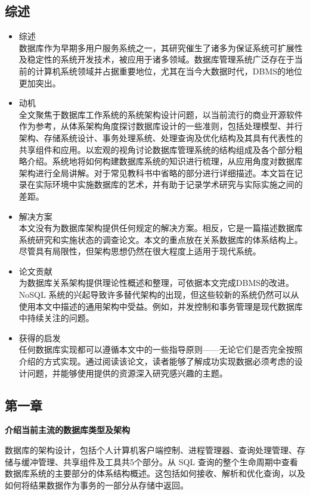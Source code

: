 \documentclass[UTF8,14pt]{article}
\numberwithin{figure}{section}
\begin{document}
\subsection{综述}
\begin{itemize}
      \item 综述\\
            数据库作为早期多用户服务系统之一，其研究催生了诸多为保证系统可扩展性及稳定性的系统开发技术，被应用于诸多领域。数据库管理系统广泛存在于当前的计算机系统领域并占据重要地位，尤其在当今大数据时代，DBMS的地位更加突出。
      \item 动机\\
            全文聚焦于数据库工作系统的系统架构设计问题，以当前流行的商业开源软件作为参考，从体系架构角度探讨数据库设计的一些准则，包括处理模型、并行架构、存储系统设计、事务处理系统、处理查询及优化结构及其具有代表性的共享组件和应用。以宏观的视角讨论数据库管理系统的结构组成及各个部分粗略介绍。系统地将如何构建数据库系统的知识进行梳理，从应用角度对数据库架构进行全局讲解。对于常见教科书中省略的部分进行详细描述。本文旨在记录在实际环境中实施数据库的艺术，并有助于记录学术研究与实际实施之间的差距。
      \item 解决方案\\
            本文没有为数据库架构提供任何规定的解决方案。相反，它是一篇描述数据库系统研究和实施状态的调查论文。本文的重点放在关系数据库的体系结构上。尽管具有局限性，但架构思想仍然在很大程度上适用于现代系统。
      \item 论文贡献\\
            为数据库关系架构提供理论性概述和整理，可依据本文完成DBMS的改进。NoSQL 系统的兴起导致许多替代架构的出现，但这些较新的系统仍然可以从使用本文中描述的通用架构中受益。例如，并发控制和事务管理是现代数据库中持续关注的问题。
      \item 获得的启发\\
            任何数据库实现都可以遵循本文中的一些指导原则——无论它们是否完全按照介绍的方式实现。通过阅读该论文，读者能够了解成功实现数据必须考虑的设计问题，并能够使用提供的资源深入研究感兴趣的主题。
\end{itemize}
\subsection{第一章}
\textbf{介绍当前主流的数据库类型及架构}

数据库的架构设计，包括个人计算机客户端控制、进程管理器、查询处理管理、存储与缓冲管理、共享组件及工具共5个部分。从 SQL 查询的整个生命周期中查看数据库系统的主要部分的体系结构概述。这包括如何接收、解析和优化查询，以及如何将结果数据作为事务的一部分从存储中返回。
\end{document}
